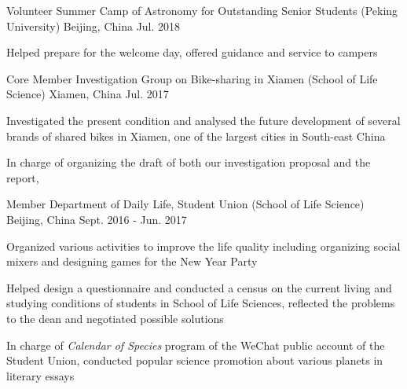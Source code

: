 


\begin{cventries}


\cventry
{Volunteer} %
{Summer Camp of Astronomy for Outstanding Senior Students (Peking University)} %
{Beijing, China} %
{Jul. 2018} %
{ %
	\begin{cvitems}
		\item {Helped prepare for the welcome day, offered guidance and service to campers}
	\end{cvitems}
}


\cventry
{Core Member} %
{Investigation Group on Bike-sharing in Xiamen (School of Life Science)} %
{Xiamen, China} %
{Jul. 2017} %
{ %
\begin{cvitems}
\item {Investigated the present condition and analysed the future development of several brands of shared bikes in Xiamen, one of the largest cities in South-east China}
\item {In charge of organizing the draft of both our investigation proposal and the report, }
\end{cvitems}
}


\cventry
{Member} %
{Department of Daily Life, Student Union (School of Life Science)} %
{Beijing, China} %
{Sept. 2016 - Jun. 2017} %
{ %
\begin{cvitems}
\item {Organized various activities to improve the life quality including organizing social mixers and designing games for the New Year Party}
\item {Helped design a questionnaire and conducted a census on the current living and studying conditions of students in School of Life Sciences, reflected the problems to the dean and negotiated possible solutions}
\item {In charge of \textit{Calendar of Species} program of the WeChat public account of the Student Union, conducted popular science promotion about various planets in literary essays}
\end{cvitems}
}


\end{cventries}
